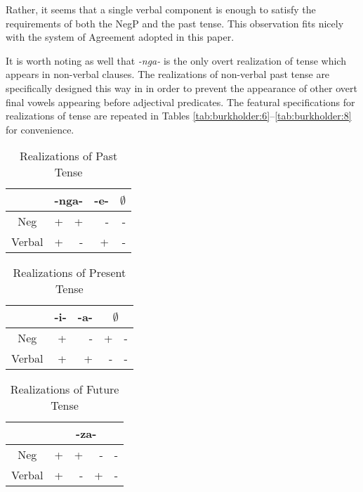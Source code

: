 \documentclass[output=paper]{langsci/langscibook}
\newcommand{\nga}[0]{\textit{-nga- }}
\begin{document}
{Rather, it seems that a single verbal component is enough to satisfy the requirements of both the NegP and the past tense. This observation fits nicely with the system of Agreement adopted in this paper.

It is worth noting as well that \nga is the only overt realization of tense which appears in non-verbal clauses. The realizations of non-verbal past tense are specifically designed this way in  in order to prevent the appearance of other overt final vowels appearing before adjectival predicates. The featural specifications for realizations of tense are repeated in Tables \ref{tab:burkholder:6}--\ref{tab:burkholder:8} for convenience. 


\begin{table}
\caption{Realizations of Past Tense} %
\centering %
\begin{tabular}{c| rr|r|r} %
\midrule%
 &\multicolumn{2}{c}{-nga-}& \multicolumn{1}{|c}{-e-}& \multicolumn{1}{|c}{$\emptyset$} \\ [0.5ex] 
\midrule%
Neg & + & + & - & -\\ %
Verbal & + & - & +& -\\[1ex] %
\midrule%
\end{tabular} 
\label{tab:hresult} 
\end{table} 





\begin{table}
\caption{Realizations of Present Tense} %
\centering %
\begin{tabular}{c| r|r|rr} %
\midrule%
 &\multicolumn{1}{c}{-i-}& \multicolumn{1}{|c|}{-a-}& \multicolumn{2}{|c}{$\emptyset$} \\ [0.5ex] 
\midrule%
Neg & + & - & + & -\\ %
Verbal & + & + & -& -\\[1ex] %
\midrule%
\end{tabular} 
\label{tab:hresult} 
\end{table} 



\begin{table}
\caption{Realizations of Future Tense} %
\centering %
\begin{tabular}{c| rrrr} %
\midrule%
 &\multicolumn{4}{c}{-za-} \\ [0.5ex] 
\midrule%
Neg & + & + & - & -\\ %
Verbal & + & - & +& -\\[1ex] %
\midrule%
\end{tabular} 
\label{tab:hresult} 
\end{table} 


}
\end{document}
